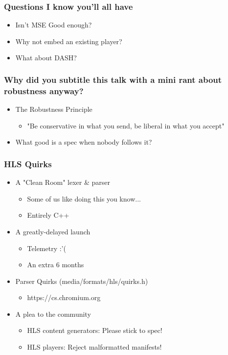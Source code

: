 \documentclass{beamer}
\begin{document}
\begin{frame}
  \frametitle{Questions I know you'll all have}
  \begin{itemize}[<+->]
    \item<1> Isn't MSE Good enough?
    \item<2> Why not embed an existing player?
    \item<3> What about DASH?
  \end{itemize}
\end{frame}
\fi

\begin{frame}
  \frametitle{Why did you subtitle this talk with a mini rant about robustness anyway?}
  \begin{itemize}[<+->]
    \item<1-2> The Robustness Principle
    \begin{itemize}[<+->]
      \item<2> "Be conservative in what you send, be liberal in what you accept"
    \end{itemize}
    \item<3> What good is a spec when nobody follows it?
  \end{itemize}
\end{frame}

\begin{frame}
  \frametitle{HLS Quirks}
  \begin{itemize}[<+->]
    \item<1-3> A "Clean Room" lexer \& parser
      \begin{itemize}[<+->]
        \item<2-3> Some of us like doing this you know...
        \item<3-3> Entirely C++
      \end{itemize}
    \item<4-6> A greatly-delayed launch
      \begin{itemize}[<+->]
        \item<5-6> Telemetry :'(
        \item<6-6> An extra 6 months
      \end{itemize}
    \item<7> Parser Quirks (media/formats/hls/quirks.h)
      \begin{itemize}[<+->]
        \item<7> https://cs.chromium.org
      \end{itemize}
    \item<8-9> A plea to the community
      \begin{itemize}[<+->]
        \item<8-9> HLS content generators: Please stick to spec!
        \item<9-9> HLS players: Reject malformatted manifests!
      \end{itemize}
  \end{itemize}
\end{frame}
\end{document}
